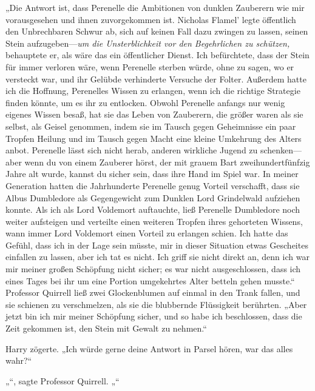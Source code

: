 „Die Antwort ist, dass Perenelle die Ambitionen von dunklen Zauberern wie mir vorausgesehen und ihnen zuvorgekommen ist. Nicholas Flamel' legte öffentlich den Unbrechbaren Schwur ab, sich auf keinen Fall dazu zwingen zu lassen, seinen Stein aufzugeben—\emph{um die Unsterblichkeit vor den Begehrlichen zu schützen,} behauptete er, als wäre das ein öffentlicher Dienst. Ich befürchtete, dass der Stein für immer verloren wäre, wenn Perenelle sterben würde, ohne zu sagen, wo er versteckt war, und ihr Gelübde verhinderte Versuche der Folter. Außerdem hatte ich die Hoffnung, Perenelles Wissen zu erlangen, wenn ich die richtige Strategie finden könnte, um es ihr zu entlocken. Obwohl Perenelle anfangs nur wenig eigenes Wissen besaß, hat sie das Leben von Zauberern, die größer waren als sie selbst, als Geisel genommen, indem sie im Tausch gegen Geheimnisse ein paar Tropfen Heilung und im Tausch gegen Macht eine kleine Umkehrung des Alters anbot. Perenelle lässt sich nicht herab, anderen wirkliche Jugend zu schenken—aber wenn du von einem Zauberer hörst, der mit grauem Bart zweihundertfünfzig Jahre alt wurde, kannst du sicher sein, dass ihre Hand im Spiel war. In meiner Generation hatten die Jahrhunderte Perenelle genug Vorteil verschafft, dass sie Albus Dumbledore als Gegengewicht zum Dunklen Lord Grindelwald aufziehen konnte. Als ich als Lord Voldemort auftauchte, ließ Perenelle Dumbledore noch weiter aufsteigen und verteilte einen weiteren Tropfen ihres gehorteten Wissens, wann immer Lord Voldemort einen Vorteil zu erlangen schien. Ich hatte das Gefühl, dass ich in der Lage sein müsste, mir in dieser Situation etwas Gescheites einfallen zu lassen, aber ich tat es nicht. Ich griff sie nicht direkt an, denn ich war mir meiner großen Schöpfung nicht sicher; es war nicht ausgeschlossen, dass ich eines Tages bei ihr um eine Portion umgekehrtes Alter betteln gehen musste.“
Professor Quirrell ließ zwei Glockenblumen auf einmal in den Trank fallen, und sie schienen zu verschmelzen, als sie die blubbernde Flüssigkeit berührten.
„Aber jetzt bin ich mir meiner Schöpfung sicher, und so habe ich beschlossen, dass die Zeit gekommen ist, den Stein mit Gewalt zu nehmen.“

Harry zögerte.
„Ich würde gerne deine Antwort in Parsel hören, war das alles wahr?“

„“, sagte Professor Quirrell.
„“

